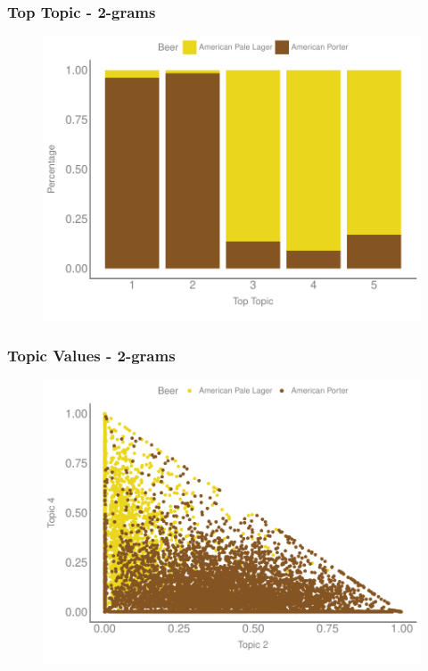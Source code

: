  \begin{frame}
    \frametitle{Top Topic - 2-grams}
\begin{figure}[htb]
\centering
\includegraphics[scale=0.6]{img/figures/topic_stacked}
\end{figure}
\end{frame}

 \begin{frame}
    \frametitle{Topic Values - 2-grams}
\begin{figure}[htb]
\centering
\includegraphics[scale=0.6]{img/figures/topic_scatter}
\end{figure}
\end{frame}

